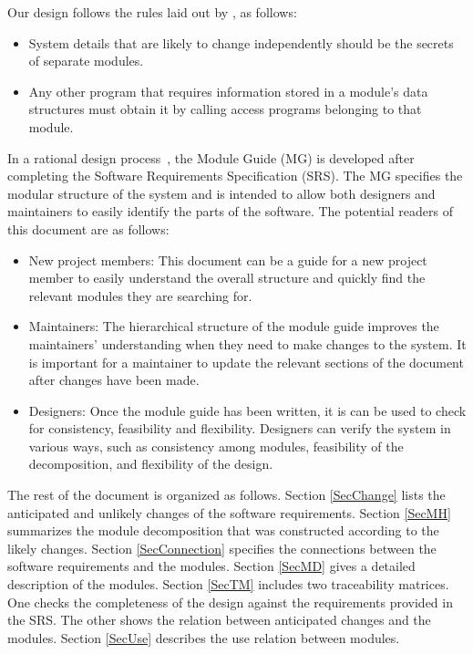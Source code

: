 \documentclass[12pt]{article}
\begin{document}
Our design follows the rules laid out by \citet{ParnasEtAl1984}, as follows:
\begin{itemize}  
\item System details that are likely to change independently should be
  the secrets of separate modules.
\item Any other program that requires information stored in a module's
  data structures must obtain it by calling access programs belonging
  to that module.
\end{itemize}

In a rational design process~\citep{ParnasEtAl1984}, the Module Guide (MG) is developed after completing the Software Requirements Specification (SRS). The MG specifies the modular
structure of the system and is intended to allow both designers and
maintainers to easily identify the parts of the software.  The
potential readers of this document are as follows:

\begin{itemize}
\item New project members: This document can be a guide for a new
  project member to easily understand the overall structure and
  quickly find the relevant modules they are searching for.
\item Maintainers: The hierarchical structure of the module guide
  improves the maintainers' understanding when they need to make
  changes to the system. It is important for a maintainer to update
  the relevant sections of the document after changes have been made.
\item Designers: Once the module guide has been written, it is can be
  used to check for consistency, feasibility and
  flexibility. Designers can verify the system in various ways, such
  as consistency among modules, feasibility of the decomposition, and
  flexibility of the design.
\end{itemize}

The rest of the document is organized as follows. Section
\ref{SecChange} lists the anticipated and unlikely changes of the
software requirements. Section \ref{SecMH} summarizes the module
decomposition that was constructed according to the likely
changes. Section \ref{SecConnection} specifies the connections between
the software requirements and the modules. Section \ref{SecMD} gives a
detailed description of the modules. Section \ref{SecTM} includes two
traceability matrices. One checks the completeness of the design
against the requirements provided in the SRS. The other shows the
relation between anticipated changes and the modules. Section
\ref{SecUse} describes the use relation between modules.
\end{document}
